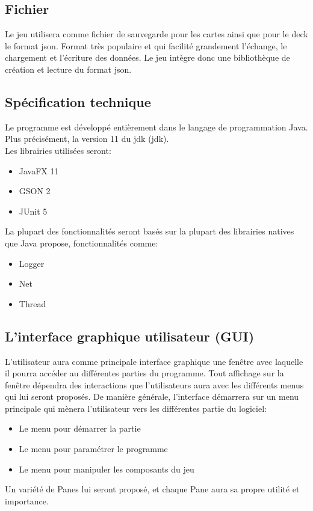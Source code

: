 \subsection{Fichier}
Le jeu utilisera comme fichier de sauvegarde pour les cartes ainsi que pour le deck le format \acrshort{json}. Format très populaire et qui facilité grandement l'échange, le chargement et l'écriture des données. Le jeu intègre donc une bibliothèque 
de création et lecture du format \acrshort{json}.

\subsection{Spécification technique}
Le programme est développé entièrement dans le langage de programmation Java. Plus précisément, la version 11 du \acrshort{jdk}  (\acrlong{jdk}).\\
Les librairies utilisées seront:
\begin{itemize}
	\item JavaFX 11
	\item GSON 2
	\item JUnit 5
\end{itemize}
La plupart des fonctionnalités seront basés sur la plupart des librairies natives que Java propose, fonctionnalités comme:
\begin{itemize}
	\item Logger
	\item Net
	\item Thread
\end{itemize}

\subsection{L'interface graphique utilisateur (GUI)}
L'utilisateur aura comme principale interface graphique une fenêtre avec laquelle il pourra accéder au différentes parties du programme. Tout affichage sur la fenêtre dépendra des interactions que l'utilisateurs aura avec les différents menus qui lui seront proposés. De manière générale, l'interface démarrera sur un menu principale qui mènera l'utilisateur vers les différentes partie du logiciel:
\begin{itemize}
	\item Le menu pour démarrer la partie
	\item Le menu pour paramétrer le programme
	\item Le menu pour manipuler les composants du jeu
\end{itemize}
Un variété de Panes lui seront proposé, et chaque Pane aura sa propre utilité et importance.